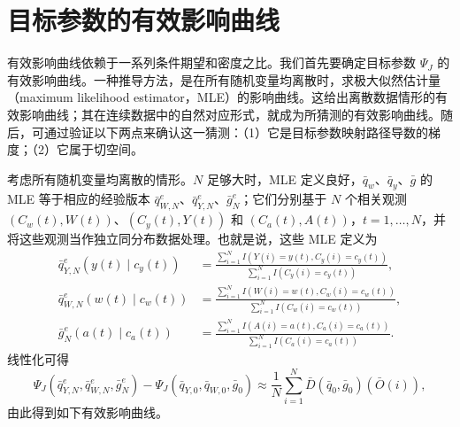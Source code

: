 \section{目标参数的有效影响曲线}

有效影响曲线依赖于一系列条件期望和密度之比。我们首先要确定目标参数 $\Psi_J$ 的有效影响曲线。一种推导方法，是在所有随机变量均离散时，求极大似然估计量（maximum likelihood estimator，MLE）的影响曲线。这给出离散数据情形的有效影响曲线；其在连续数据中的自然对应形式，就成为所猜测的有效影响曲线。随后，可通过验证以下两点来确认这一猜测：（1）它是目标参数映射路径导数的梯度；（2）它属于切空间。

考虑所有随机变量均离散的情形。$N$ 足够大时，MLE 定义良好，$\bar q_w$、$\bar q_y$、$\bar g$ 的 MLE 等于相应的经验版本 $\bar q^e_{W,N}$、$\bar q^e_{Y,N}$、$\bar g^e_N$；它们分别基于 $N$ 个相关观测 $(C_w(t),W(t))$、$(C_y(t),Y(t))$ 和 $(C_a(t),A(t))$，$t=1,\ldots,N$，并将这些观测当作独立同分布数据处理。也就是说，这些 MLE 定义为
\[
\begin{aligned}
 \bar q^e_{Y,N}(y(t)\mid c_y(t))
 &=\frac{\sum_{i=1}^N I(Y(i)=y(t),C_y(i)=c_y(t))}
 {\sum_{i=1}^N I(C_y(i)=c_y(t))},\\
 \bar q^e_{W,N}(w(t)\mid c_w(t))
 &=\frac{\sum_{i=1}^N I(W(i)=w(t),C_w(i)=c_w(t))}
 {\sum_{i=1}^N I(C_w(i)=c_w(t))},\\
 \bar g^e_N(a(t)\mid c_a(t))
 &=\frac{\sum_{i=1}^N I(A(i)=a(t),C_a(i)=c_a(t))}
 {\sum_{i=1}^N I(C_a(i)=c_a(t))}.
\end{aligned}
\]
线性化可得
\[
 \Psi_J(\bar q^e_{Y,N},\bar q^e_{W,N},\bar g^e_N)
 -\Psi_J(\bar q_{Y,0},\bar q_{W,0},\bar g_0)
 \approx\frac1N\sum_{i=1}^N\bar D(\bar q_0,\bar g_0)(\bar O(i)),
\]
由此得到如下有效影响曲线。

